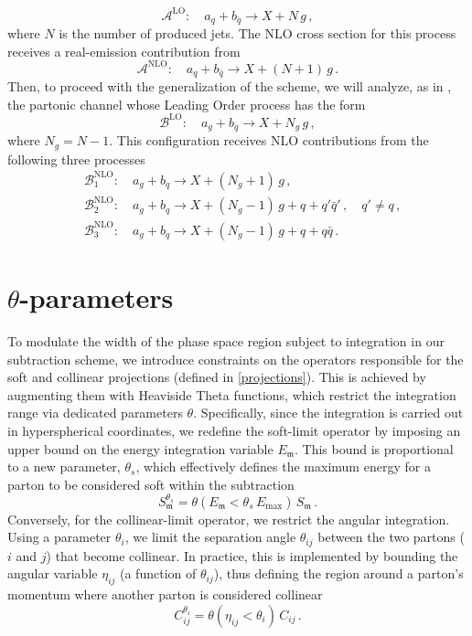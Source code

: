 \documentclass[a4paper, 12pt]{book}
\newcommand{\um}{\mathfrak{m}}
\begin{document}
\begin{equation}
  \mathcal{A}^{\mathrm{LO}}: \quad a_q + b_{\bar{q}} \to X + N \, g \, ,
\end{equation}
where $N$ is the number of produced jets. The NLO cross section for this process receives a real-emission contribution from
\begin{equation}
  \mathcal{A}^{\mathrm{NLO}}: \quad a_q + b_{\bar{q}} \to X + (N+1) \, g \, .
\end{equation}
Then, to proceed with the generalization of the scheme, we will analyze, as in \cite{Devoto:2025kin}, the partonic channel whose Leading Order process has the form
\begin{equation}
  \mathcal{B}^{\mathrm{LO}}: \quad a_g + b_q \to X + N_g \, g \, ,
\end{equation}
where $N_g=N-1$. This configuration receives NLO contributions from the following three processes
\begin{equation}
  \begin{aligned}
    &\mathcal{B}_1^{\mathrm{NLO}} : \quad a_g + b_q \to X + (N_g+1) \, g \, , \\
    & \mathcal{B}_2^{\mathrm{NLO}} : \quad a_g + b_q \to X + (N_g-1) \, g +q + q'\bar{q}'\, , \quad q' \neq q \, , \\
    & \mathcal{B}_3^{\mathrm{NLO}} : \quad a_g + b_q \to X + (N_g-1) \, g +q + q\bar{q}\,  .
  \end{aligned}
\end{equation}

\section{$\theta$-parameters}
To modulate the width of the phase space region subject to integration in our subtraction scheme, we introduce constraints on the operators responsible for the soft and collinear projections (defined in \ref{projections}). This is achieved by augmenting them with Heaviside Theta functions, which restrict the integration range via dedicated parameters $\theta$. Specifically, since the integration is carried out in hyperspherical coordinates, we redefine the soft-limit operator by imposing an upper bound on the energy integration variable $E_\um$. This bound is proportional to a new parameter, $\theta_s$, which effectively defines the maximum energy for a parton to be considered soft within the subtraction
\begin{equation}
S_\um^{\theta_s} = \theta{(E_\um < \theta_s \, E_{\mathrm{max}})} \, S_\um \,.
\end{equation}
Conversely, for the collinear-limit operator, we restrict the angular integration. Using a parameter $\theta_i$, we limit the separation angle $\theta_{ij}$ between the two partons ($i$ and $j$) that become collinear. In practice, this is implemented by bounding the angular variable $\eta_{ij}$ (a function of $\theta_{ij}$), thus defining the region around a parton's momentum where another parton is considered collinear
\begin{equation}
C_{ij}^{\theta_i} = \theta{(\eta_{ij} < \theta_i )} \, C_{ij}\, .
\end{equation}
\end{document}
